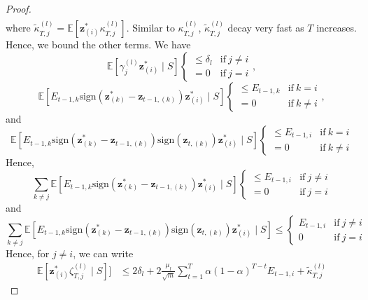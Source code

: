 \documentclass[10pt]{article} %
\newcommand{\E}{\mathbb{E}} %
\newcommand{\z}{{\bm z}}
\begin{document}
\begin{proof}
\begin{equation}
\begin{aligned}
\end{aligned}
\end{equation}
where $\tilde \kappa_{T,j}^{(l)} = \E[\z_{(i)}^{\ast} \kappa_{T,j}^{(l)}]$. Similar to $\kappa_{T,j}^{(l)}$, $\tilde \kappa_{T,j}^{(l)}$ decay very fast as $T$ increases. Hence, we bound the other terms. We have
\begin{equation}
\E[ \gamma_j^{(l)} \z_{(i)}^{\ast}\mid S] \begin{cases} 
\leq \delta_l &\text{if}\ j \neq i\\
= 0 &\text{if}\ j = i
\end{cases}
,
\end{equation}
\begin{equation}
\E[ E_{t-1,k} \text{sign}(\z_{(k)}^{\ast} - \z_{t-1,(k)}) \z_{(i)}^{\ast} \mid S ]
\begin{cases} 
\leq E_{t-1,k} &\text{if}\ k = i\\
= 0 &\text{if}\ k \neq i
\end{cases}
,
\end{equation}
and
\begin{equation}
\E[ E_{t-1,k} \text{sign}(\z_{(k)}^{\ast} - \z_{t-1,(k)}) \text{sign}(\z_{t, (k)}) \z_{(i)}^{\ast} \mid S ] \begin{cases} 
\leq E_{t-1,i} &\text{if}\ k = i\\
= 0 &\text{if}\ k \neq i
\end{cases}
\end{equation}
Hence,
\begin{equation}
\sum_{k\neq j} \E[ E_{t-1,k} \text{sign}(\z_{(k)}^{\ast} - \z_{t-1,(k)}) \z_{(i)}^{\ast} \mid S ] \begin{cases} 
\leq E_{t-1,i} &\text{if}\ j \neq i\\
= 0 &\text{if}\ j = i
\end{cases}
\end{equation}
and
\begin{equation}
\sum_{k\neq j} \E[ E_{t-1,k} \text{sign}(\z_{(k)}^{\ast} - \z_{t-1,(k)}) \text{sign}(\z_{t, (k)}) \z_{(i)}^{\ast} \mid S ] \leq \begin{cases} 
E_{t-1,i} &\text{if}\ j \neq i\\
0 &\text{if}\ j = i
\end{cases}
\end{equation}
Hence, for $j \neq i$, we can write
\begin{equation}
\begin{aligned}
\E[\z_{(i)}^{\ast} \zeta_{T,j}^{(l)} \mid S]] &\leq 2\delta_l + 2\frac{\mu_l}{\sqrt{m}} \sum_{t=1}^T \alpha (1 - \alpha)^{T-t} E_{t-1,i} + \tilde \kappa_{T,j}^{(l)}

\end{aligned}
\end{equation}
\end{proof}
\end{document}
